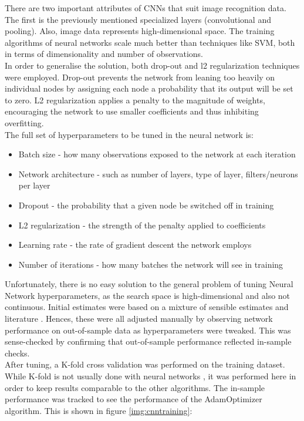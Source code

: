 \documentclass[12pt]{article}
\begin{document}
There are two important attributes of CNNs that suit image recognition data. The first is the previously mentioned specialized layers (convolutional and pooling). Also, image data represents high-dimensional space. The training algorithms of neural networks scale much better than techniques like SVM, both in terms of dimensionality and number of observations.\\

In order to generalise the solution, both drop-out and l2 regularization techniques were employed. Drop-out prevents the network from leaning too heavily on individual nodes by assigning each node a probability that its output will be set to zero. L2 regularization applies a penalty to the magnitude of weights, encouraging the network to use smaller coefficients and thus inhibiting overfitting.\\

The full set of hyperparameters to be tuned in the neural network is:
\begin{itemize}
\item Batch size - how many observations exposed to the network at each iteration
\item Network architecture - such as  number of layers, type of layer, filters/neurons per layer
\item Dropout - the probability that a given node be switched off in training
\item L2 regularization - the strength of the penalty applied to coefficients
\item Learning rate - the rate of gradient descent the network employs
\item Number of iterations - how many batches the network will see in training
\end{itemize}

Unfortunately, there is no easy solution to the general problem of tuning Neural Network hyperparameters, as the search space is high-dimensional and also not continuous. Initial estimates were based on a mixture of sensible estimates and literature \citep{nnoptim}. Hences, these were all adjusted manually by observing network performance on out-of-sample data as hyperparameters were tweaked. This was sense-checked by confirming that out-of-sample performance reflected in-sample checks. \\

After tuning, a K-fold cross validation was performed on the training dataset. While K-fold is not usually done with neural networks \citep{nnoptim}, it was performed here in order to keep results comparable to the other algorithms. The in-sample performance was tracked to see the performance of the AdamOptimizer algorithm. This is shown in figure \ref{img:cnntraining}:\\
\end{document}

